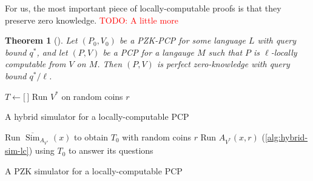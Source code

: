 \documentclass[english,12pt]{reedthesis}
\theoremstyle{plain}
\newtheorem{thm}{Theorem}[section]
\theoremstyle{definition}
\theoremstyle{remark}
\DeclareMathOperator{\Sim}{Sim}
\newcommand{\TODO}[1]{\textcolor{red}{TODO: #1}}
\begin{document}
For us, the most important piece of locally-computable proofs is that they
preserve zero knowledge. \TODO{A little more}

\begin{thm}[{\cite[Lemma 3.2]{GOS25}}]\label{thm:local-comp-pzk}
  Let $(P_{0}, V_{0})$ be a PZK-PCP for some language $L$ with query bound
  $q^{*}$, and let $(P, V)$ be a PCP for a langauge $M$ such that $P$ is
  $\ell$-locally computable from $V$ on $M$. Then $(P, V)$ is perfect
  zero-knowledge with query bound $q^{*}/\ell$.
\end{thm}

\begin{algorithm}[htbp]
  $T \leftarrow \lbrack\,\rbrack$\;
  Run $V^{*}$ on random coins $r$\;
  \;
  \caption{A hybrid simulator for a locally-computable PCP~\cite[Construction
    3.3]{GOS25}}\label{alg:hybrid-sim-lc}
\end{algorithm}

\begin{algorithm}[htbp]
  Run $\overline{\Sim}_{A_{V^{*}}}(x)$ to obtain $T_{0}$ with random coins $r$\;
  Run $A_{V^{*}}(x, r)$ (\cref{alg:hybrid-sim-lc}) using $T_{0}$ to answer its
  questions\;
  \;
  \caption{A PZK simulator for a locally-computable PCP~\cite[Construction
    3.4]{GOS25}}\label{alg:pzk-sim-lc}
\end{algorithm}
\end{document}

